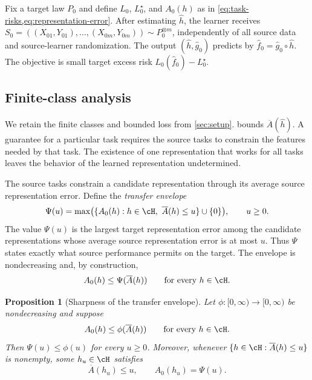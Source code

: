 \documentclass[11pt,twoside]{article}
\newtheorem{proposition}[theorem]{Proposition}
\theoremstyle{definition}
\theoremstyle{remark}
\begin{document}
Fix a target law $P_0$ and define $L_0$, $L_0^\star$, and $A_0(h)$ as in
\cref{eq:task-risks,eq:representation-error}. After estimating $\widehat h$,
the learner receives
$S_0=((X_{01},Y_{01}),\ldots,(X_{0m},Y_{0m}))\sim P_0^{\otimes m}$,
independently of all source data and source-learner randomization.
The output $(\widehat h,\widehat g_0)$ predicts by
$\widehat f_0=\widehat g_0\circ\widehat h$. The objective is small target
excess risk $L_0(\widehat f_0)-L_0^\star$.

\subsection{Finite-class analysis}

We retain the finite classes and bounded loss from \cref{sec:setup}.
 bounds $\overline A(\widehat h)$. A guarantee for a
particular task requires the source tasks to constrain the features needed
by that task. The existence of one representation that works for all tasks
leaves the behavior of the learned representation undetermined.

The source tasks constrain a candidate representation through its average
source representation error. Define the \emph{transfer envelope}
\begin{equation}
 \Psi(u)
 =
 \max\bigl(\{A_0(h):h\in\cH,\ \overline A(h)\le u\}\cup\{0\}\bigr),
 \qquad u\ge0.
 \label{eq:transfer-envelope}
\end{equation}
The value $\Psi(u)$ is the largest target representation error among the
candidate representations whose average source representation error is at
most $u$. Thus $\Psi$ states exactly what source performance permits on the
target. The envelope is nondecreasing and, by construction,
\begin{equation}
 A_0(h)\le\Psi(\overline A(h))
 \qquad\text{for every }h\in\cH.
 \label{eq:transfer-calibration}
\end{equation}

\begin{proposition}[Sharpness of the transfer envelope]
\label{prop:transfer-envelope-sharpness}
Let $\phi:[0,\infty)\to[0,\infty)$ be nondecreasing and suppose
\[
 A_0(h)\le\phi(\overline A(h))
 \qquad\text{for every }h\in\cH.
\]
Then $\Psi(u)\le\phi(u)$ for every $u\ge0$. Moreover, whenever
$\{h\in\cH:\overline A(h)\le u\}$ is nonempty, some $h_u\in\cH$ satisfies
\[
 \overline A(h_u)\le u,
 \qquad
 A_0(h_u)=\Psi(u).
\]
\end{proposition}
\end{document}
